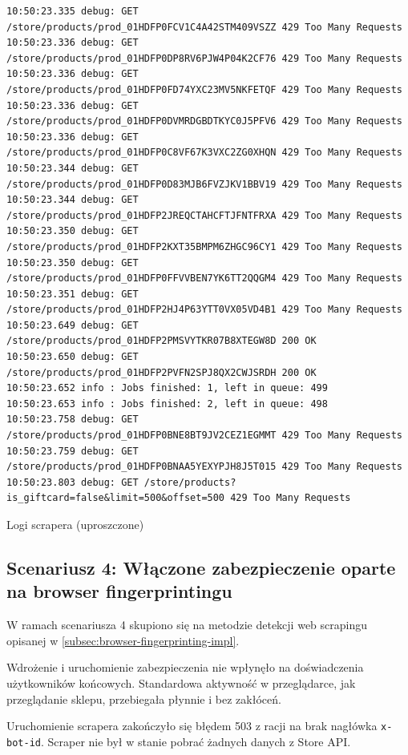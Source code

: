 \begin{listing}[p]
\begin{verbatim}
10:50:23.335 debug: GET /store/products/prod_01HDFP0FCV1C4A42STM409VSZZ 429 Too Many Requests
10:50:23.336 debug: GET /store/products/prod_01HDFP0DP8RV6PJW4P04K2CF76 429 Too Many Requests
10:50:23.336 debug: GET /store/products/prod_01HDFP0FD74YXC23MV5NKFETQF 429 Too Many Requests
10:50:23.336 debug: GET /store/products/prod_01HDFP0DVMRDGBDTKYC0J5PFV6 429 Too Many Requests
10:50:23.336 debug: GET /store/products/prod_01HDFP0C8VF67K3VXC2ZG0XHQN 429 Too Many Requests
10:50:23.344 debug: GET /store/products/prod_01HDFP0D83MJB6FVZJKV1BBV19 429 Too Many Requests
10:50:23.344 debug: GET /store/products/prod_01HDFP2JREQCTAHCFTJFNTFRXA 429 Too Many Requests
10:50:23.350 debug: GET /store/products/prod_01HDFP2KXT35BMPM6ZHGC96CY1 429 Too Many Requests
10:50:23.350 debug: GET /store/products/prod_01HDFP0FFVVBEN7YK6TT2QQGM4 429 Too Many Requests
10:50:23.351 debug: GET /store/products/prod_01HDFP2HJ4P63YTT0VX05VD4B1 429 Too Many Requests
10:50:23.649 debug: GET /store/products/prod_01HDFP2PMSVYTKR07B8XTEGW8D 200 OK
10:50:23.650 debug: GET /store/products/prod_01HDFP2PVFN2SPJ8QX2CWJSRDH 200 OK
10:50:23.652 info : Jobs finished: 1, left in queue: 499
10:50:23.653 info : Jobs finished: 2, left in queue: 498
10:50:23.758 debug: GET /store/products/prod_01HDFP0BNE8BT9JV2CEZ1EGMMT 429 Too Many Requests
10:50:23.759 debug: GET /store/products/prod_01HDFP0BNAA5YEXYPJH8J5T015 429 Too Many Requests
10:50:23.803 debug: GET /store/products?is_giftcard=false&limit=500&offset=500 429 Too Many Requests
    \end{verbatim}
    \caption{Logi scrapera (uproszczone)}
    \label{lst:rate-limiting-scraper-logs}
\end{listing}

\subsection{Scenariusz 4: Włączone zabezpieczenie oparte na browser fingerprintingu}\label{subsec:scenariusz-3:-waczone-zabezpieczenie-oparte-na-browser-fingerprintingu}

W ramach scenariusza 4 skupiono się na metodzie detekcji web scrapingu opisanej w \autoref{subsec:browser-fingerprinting-impl}.

Wdrożenie i uruchomienie zabezpieczenia nie wpłynęło na doświadczenia użytkowników końcowych.
Standardowa aktywność w przeglądarce, jak przeglądanie sklepu, przebiegała płynnie i bez zakłóceń.

Uruchomienie scrapera zakończyło się błędem 503 z racji na brak nagłówka \texttt{x-bot-id}.
Scraper nie był w stanie pobrać żadnych danych z Store API\@.


